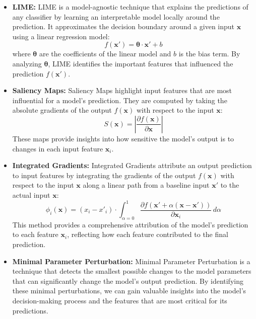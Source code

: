 \documentclass[journal, a4paper]{IEEEtran}
\begin{document}
\begin{itemize}
    \item \textbf{LIME:} LIME is a model-agnostic technique that explains the predictions of any classifier by learning an interpretable model locally around the prediction.
          It approximates the decision boundary around a given input \( \mathbf{x} \) using a linear regression model:
          \[
              f(\mathbf{x}') = \boldsymbol{\theta} \cdot \mathbf{x}' + b
          \]
          where \( \boldsymbol{\theta} \) are the coefficients of the linear model and \( b \) is the bias term.
          By analyzing \( \boldsymbol{\theta} \), LIME identifies the important features that influenced the prediction \( f(\mathbf{x}') \).

    \item \textbf{Saliency Maps:}
          Saliency Maps highlight input features that are most influential for a model's prediction.
          They are computed by taking the absolute gradients of the output \( f(\mathbf{x}) \) with respect to the input \( \mathbf{x} \):
          \[
              S(\mathbf{x}) = \left|\frac{\partial f(\mathbf{x})}{\partial \mathbf{x}}\right|
          \]
          These maps provide insights into how sensitive the model's output is to changes in each input feature \( \mathbf{x}_i \).

    \item \textbf{Integrated Gradients:}
          Integrated Gradients attribute an output prediction to input features by integrating the gradients of the output \( f(\mathbf{x}) \) with respect to the input \( \mathbf{x} \) along a linear path from a baseline input \( \mathbf{x}' \) to the actual input \( \mathbf{x} \):
          \[
              \phi_i(\mathbf{x}) = (x_i - x'_i) \cdot \int_{\alpha=0}^{1} \frac{\partial f(\mathbf{x}' + \alpha (\mathbf{x} - \mathbf{x}'))}{\partial \mathbf{x}_i} \, d\alpha
          \]
          This method provides a comprehensive attribution of the model's prediction to each feature \( \mathbf{x}_i \), reflecting how each feature contributed to the final prediction.

    \item \textbf{Minimal Parameter Perturbation:}
          Minimal Parameter Perturbation is a technique that detects the smallest possible changes to the model parameters that can significantly change the model's output prediction.
          By identifying these minimal perturbations, we can gain valuable insights into the model's decision-making process and the features that are most critical for its predictions.
\end{itemize}
\end{document}
